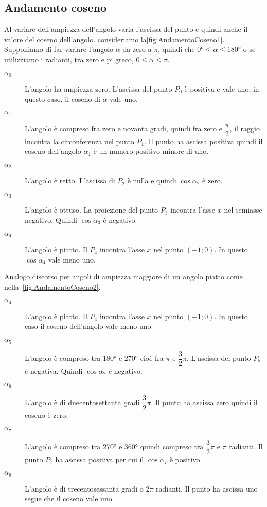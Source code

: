 \subsection{Andamento coseno}
\label{sec:andamentocoseno}
Al variare dell'ampiezza dell'angolo varia l'ascissa del punto e quindi anche il valore del coseno dell'angolo. consideriamo la\nobs\vref{fig:AndamentoCoseno1}. Supponiamo di far variare l'angolo $\alpha$ da zero a $\pi$, quindi che $\ang{0}\leq\alpha\leq\ang{180}$ o se utilizziamo i radianti, tra zero e pi greco, $\num{0}\leq\alpha\leq\pi$. 
\begin{description}
	\item[$\alpha_0$] L'angolo ha ampiezza zero. L'ascissa  del punto $P_0$ è positiva e vale uno, in questo caso, il coseno di $\alpha$ vale uno.
	\item [$\alpha_1$] L'angolo è compreso fra zero e novanta gradi, quindi fra zero e $\dfrac{\pi}{2} $, il raggio incontra la circonferenza nel punto $P_1$. Il punto ha ascissa positiva quindi il coseno dell'angolo $\alpha_1$ è un numero positivo minore di uno.
	\item [$\alpha_2$] L'angolo è retto. L'ascissa di $P_{2}$ è nulla e quindi $\cos\alpha_2$ è zero. 
	\item [$\alpha_3$] L'angolo è ottuso. La proiezione del punto $P_3$ incontra l'asse $x$ nel semiasse negativo. Quindi $\cos\alpha_3$ è negativo.
	\item [$\alpha_4$] L'angolo è piatto. Il $P_4$ incontra l'asse $x$ nel punto $(-1;0)$. In questo $\cos\alpha_4$ vale meno uno.
\end{description}
\begin{figure}
	\centering
	
	\label{fig:circonferenzagonimetricagonio}
\end{figure}
Analogo discorso per angoli di ampiezza maggiore di un angolo piatto come nella~\vref{fig:AndamentoCoseno2}.
\begin{description}
	\item [$\alpha_4$] L'angolo è piatto. Il $P_4$ incontra l'asse $x$ nel punto $(-1;0)$. In questo caso il coseno dell'angolo vale meno uno.
	\item [$\alpha_5$] L'angolo è compreso tra \ang{180} e \ang{270} cioè fra $\pi$ e $\dfrac{3}{2}\pi$. L'ascissa del punto $P_5$ è negativa. Quindi $\cos\alpha_2$ è negativo.
	\item [$\alpha_6$] L'angolo è di duecentosettanta gradi $\dfrac{3}{2}\pi$. Il punto ha ascissa zero quindi il coseno è zero.
	\item [$\alpha_7$] L'angolo è compreso tra \ang{270} e \ang{360} quindi compreso tra $\dfrac{3}{2}\pi$ e $\pi$ radianti. Il punto $P_7$ ha ascissa positiva per cui il  $\cos\alpha_7$ è positivo.
	\item [$\alpha_8$] L'angolo è di trecentosessanta gradi o $2\pi$ radianti. Il punto ha ascissa uno segue che il coseno vale uno.
\end{description}
